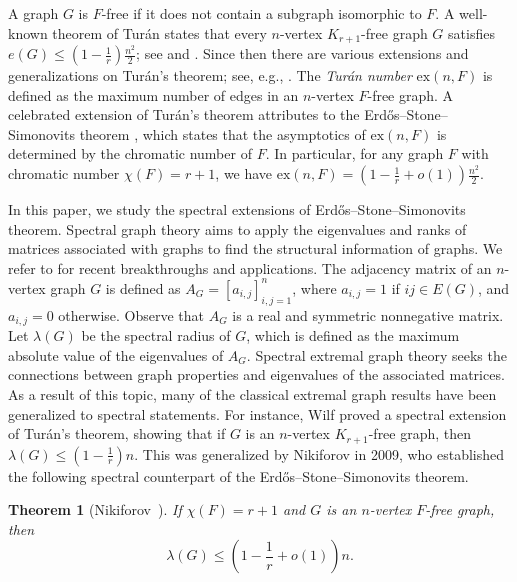 \documentclass[11pt,a4paper]{article}
\newtheorem{theorem}{Theorem}[section]
\theoremstyle{definition}
\theoremstyle{remark}
\begin{document}
A graph $G$ is $F$-free if it does not contain a subgraph isomorphic to $F$. A well-known theorem of Tur\'{a}n \cite{Tur1941} 
states that every $n$-vertex $K_{r+1}$-free graph $G$ satisfies $e(G)\le \left(1-\frac{1}{r} \right) \frac{n^2}{2}$; 
see \cite[p. 294]{Bollobas78} and \cite[p. 269]{AZ2014}. 
Since then there are various extensions and generalizations on Tur\'{a}n's theorem; see, e.g., \cite{BT1981,Bon1983}. 
The \emph{Tur\'{a}n number} $\mathrm{ex}(n,F)$ is defined as the maximum number of edges in an $n$-vertex $F$-free graph. 
A celebrated extension of Tur\'{a}n's theorem attributes to the Erd\H{o}s--Stone--Simonovits theorem \cite{ES46,ES66}, which states that the asymptotics of $\mathrm{ex}(n,F)$ is determined by the chromatic number of $F$. In particular, for any graph $F$ with chromatic number $\chi (F)=r+1$, we have 
$\mathrm{ex}(n,F) = \left(  1-\frac{1}{r} + o(1)\right) \frac{n^2}{2}$.  




In this paper, we study the spectral extensions of Erd\H{o}s--Stone--Simonovits theorem.  Spectral graph theory aims to apply the eigenvalues and ranks of matrices associated with graphs to find the structural information of graphs. 
We refer to \cite{Huang2019,JTYZZ2021} for recent breakthroughs and applications. 
The adjacency matrix of an $n$-vertex graph $G$ is defined as $A_G=[a_{i,j}]_{i,j=1}^n$, where $a_{i,j}=1$ if $ij\in E(G)$, and $a_{i,j}=0$ otherwise. Observe that $A_G$ is a real and symmetric nonnegative matrix.  
Let $\lambda (G)$ be the spectral radius of $G$, which is defined as the maximum absolute value of the eigenvalues of $A_G$. 
Spectral extremal graph theory seeks the connections between graph properties and eigenvalues of the associated matrices. As a result of this topic, many of the classical extremal graph results have been generalized to spectral statements. 
For instance, Wilf \cite{Wil1986} proved a spectral extension of Tur\'{a}n's theorem, showing that if $G$ is an $n$-vertex $K_{r+1}$-free graph, then $\lambda (G)\le \left(1- \frac{1}{r} \right)n$. This was generalized by Nikiforov  \cite{Niki2009cpc} in 2009, who established the following spectral counterpart of the Erd\H{o}s--Stone--Simonovits theorem.
\begin{theorem}[Nikiforov~\cite{Niki2009cpc}] 
 \label{thm-spec-ESS} 
If $\chi (F)=r+1$ and $G$ is an $n$-vertex $F$-free graph, then 
\begin{equation*}  \label{eq-spec-ESS}
  \lambda(G) \le 
\left( 1-\frac{1}{r} + o(1)\right) n. 
\end{equation*}
\end{theorem}
\end{document}

